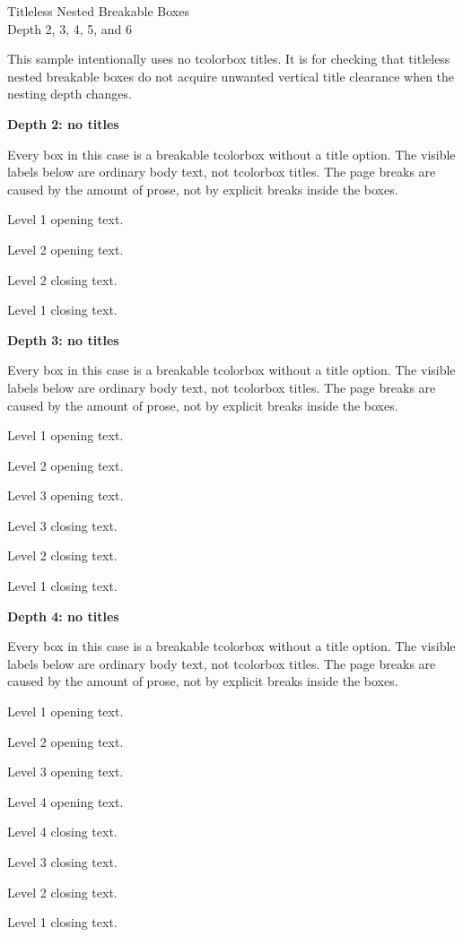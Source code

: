 \documentclass[a4paper,10pt]{article}
\newcommand{\caselead}[1]{%
  \clearpage
  {\Large\bfseries #1\par}
  \medskip
  Every box in this case is a breakable tcolorbox without a title option.
  The visible labels below are ordinary body text, not tcolorbox titles.
  The page breaks are caused by the amount of prose, not by explicit breaks
  inside the boxes.
  \medskip
}
\newcommand{\innertext}{%
  \lipsum[1-5]
  \medskip
  \lipsum[6-9]
}
\begin{document}
\begin{center}
{\LARGE Titleless Nested Breakable Boxes}\\[3mm]
{\large Depth 2, 3, 4, 5, and 6}
\end{center}

\bigskip
This sample intentionally uses no tcolorbox titles. It is for checking that
titleless nested breakable boxes do not acquire unwanted vertical title
clearance when the nesting depth changes.

\caselead{Depth 2: no titles}
\begin{depthone}
Level 1 opening text.

\begin{depthtwo}
Level 2 opening text.

\innertext

Level 2 closing text.
\end{depthtwo}

Level 1 closing text.
\end{depthone}

\caselead{Depth 3: no titles}
\begin{depthone}
Level 1 opening text.

\begin{depthtwo}
Level 2 opening text.

\begin{depththree}
Level 3 opening text.

\innertext

Level 3 closing text.
\end{depththree}

Level 2 closing text.
\end{depthtwo}

Level 1 closing text.
\end{depthone}

\caselead{Depth 4: no titles}
\begin{depthone}
Level 1 opening text.

\begin{depthtwo}
Level 2 opening text.

\begin{depththree}
Level 3 opening text.

\begin{depthfour}
Level 4 opening text.

\innertext

Level 4 closing text.
\end{depthfour}

Level 3 closing text.
\end{depththree}

Level 2 closing text.
\end{depthtwo}

Level 1 closing text.
\end{depthone}
\end{document}
